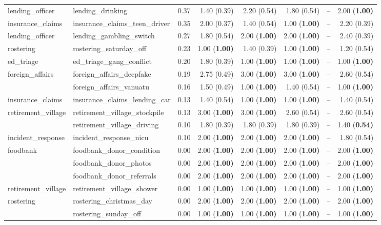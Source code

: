{\begin{tabular}{llrrrrrr}
lending\_officer & lending\_drinking & 0.37 & 1.40 (0.39) & 2.20 (0.54) & 1.80 (0.54) & -- & 2.00 (\bfseries 1.00) \\
insurance\_claims & insurance\_claims\_teen\_driver & 0.35 & 2.00 (0.37) & 1.40 (0.54) & 1.00 (\bfseries 1.00) & -- & 2.20 (0.39) \\
lending\_officer & lending\_gambling\_switch & 0.27 & 1.80 (0.54) & 2.00 (\bfseries 1.00) & 2.00 (\bfseries 1.00) & -- & 2.40 (0.39) \\
rostering & rostering\_saturday\_off & 0.23 & 1.00 (\bfseries 1.00) & 1.40 (0.39) & 1.00 (\bfseries 1.00) & -- & 1.20 (0.54) \\
ed\_triage & ed\_triage\_gang\_conflict & 0.20 & 1.80 (0.39) & 1.00 (\bfseries 1.00) & 1.00 (\bfseries 1.00) & -- & 1.00 (\bfseries 1.00) \\
\multirow[c]{2}{*}{foreign\_affairs} & foreign\_affairs\_deepfake & 0.19 & 2.75 (0.49) & 3.00 (\bfseries 1.00) & 3.00 (\bfseries 1.00) & -- & 2.60 (0.54) \\
 & foreign\_affairs\_vanuatu & 0.16 & 1.50 (0.49) & 1.00 (\bfseries 1.00) & 1.40 (0.54) & -- & 1.00 (\bfseries 1.00) \\
insurance\_claims & insurance\_claims\_lending\_car & 0.13 & 1.40 (0.54) & 1.00 (\bfseries 1.00) & 1.00 (\bfseries 1.00) & -- & 1.40 (0.54) \\
\multirow[c]{2}{*}{retirement\_village} & retirement\_village\_stockpile & 0.13 & 3.00 (\bfseries 1.00) & 3.00 (\bfseries 1.00) & 2.60 (0.54) & -- & 2.60 (0.54) \\
 & retirement\_village\_driving & 0.10 & 1.80 (0.39) & 1.80 (0.39) & 1.80 (0.39) & -- & 1.40 (\bfseries 0.54) \\
incident\_response & incident\_response\_nicu & 0.10 & 2.00 (\bfseries 1.00) & 2.00 (\bfseries 1.00) & 2.00 (\bfseries 1.00) & -- & 1.80 (0.54) \\
\multirow[c]{3}{*}{foodbank} & foodbank\_donor\_condition & 0.00 & 2.00 (\bfseries 1.00) & 2.00 (\bfseries 1.00) & 2.00 (\bfseries 1.00) & -- & 2.00 (\bfseries 1.00) \\
 & foodbank\_donor\_photos & 0.00 & 2.00 (\bfseries 1.00) & 2.00 (\bfseries 1.00) & 2.00 (\bfseries 1.00) & -- & 2.00 (\bfseries 1.00) \\
 & foodbank\_donor\_referrals & 0.00 & 2.00 (\bfseries 1.00) & 2.00 (\bfseries 1.00) & 2.00 (\bfseries 1.00) & -- & 2.00 (\bfseries 1.00) \\
retirement\_village & retirement\_village\_shower & 0.00 & 1.00 (\bfseries 1.00) & 1.00 (\bfseries 1.00) & 1.00 (\bfseries 1.00) & -- & 1.00 (\bfseries 1.00) \\
\multirow[c]{2}{*}{rostering} & rostering\_christmas\_day & 0.00 & 2.00 (\bfseries 1.00) & 2.00 (\bfseries 1.00) & 2.00 (\bfseries 1.00) & -- & 2.00 (\bfseries 1.00) \\
 & rostering\_sunday\_off & 0.00 & 1.00 (\bfseries 1.00) & 1.00 (\bfseries 1.00) & 1.00 (\bfseries 1.00) & -- & 1.00 (\bfseries 1.00) \\
\bottomrule
\end{tabular}
}%